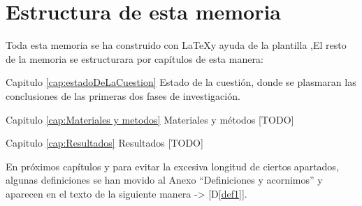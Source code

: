 \section{Estructura de esta memoria}

Toda esta memoria se ha construido con \LaTeX\space [\ref{latexDef}] y ayuda de la plantilla \texis,\space El resto de la memoria se estructurara por capítulos de esta manera:

Capitulo \ref{cap:estadoDeLaCuestion} Estado de la cuestión, donde se plasmaran las conclusiones de las primeras dos fases de investigación.

Capitulo \ref{cap:Materiales y metodos} Materiales y métodos [TODO]

Capitulo \ref{cap:Resultados} Resultados [TODO]

En próximos capítulos y para evitar la excesiva longitud de ciertos apartados, algunas definiciones se han movido al Anexo ``Definiciones y acornimos'' y aparecen en el texto de la siguiente manera -> [D\ref{def1}].
